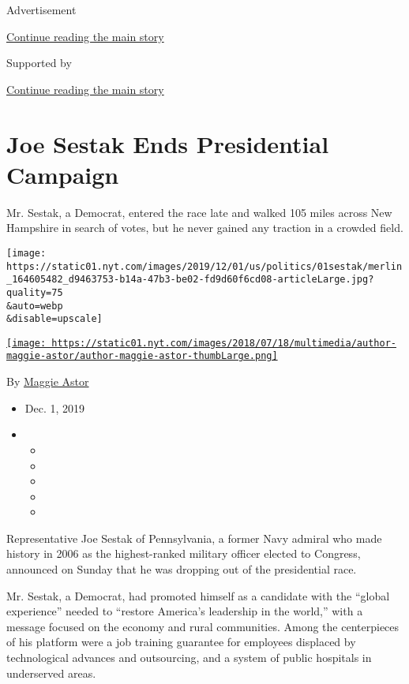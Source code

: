 Advertisement

\protect\hyperlink{after-top}{Continue reading the main story}

Supported by

\protect\hyperlink{after-sponsor}{Continue reading the main story}

\hypertarget{joe-sestak-ends-presidential-campaign}{%
\section{Joe Sestak Ends Presidential
Campaign}\label{joe-sestak-ends-presidential-campaign}}

Mr. Sestak, a Democrat, entered the race late and walked 105 miles
across New Hampshire in search of votes, but he never gained any
traction in a crowded field.

\texttt{[image: https://static01.nyt.com/images/2019/12/01/us/politics/01sestak/merlin\_164605482\_d9463753-b14a-47b3-be02-fd9d60f6cd08-articleLarge.jpg?quality=75\\\&auto=webp\\\&disable=upscale]}

\href{https://www.nytimes.com/by/maggie-astor}{\texttt{[image: https://static01.nyt.com/images/2018/07/18/multimedia/author-maggie-astor/author-maggie-astor-thumbLarge.png]}}

By \href{https://www.nytimes.com/by/maggie-astor}{Maggie Astor}

\begin{itemize}
\item
  Dec. 1, 2019
\item
  \begin{itemize}
  \item
  \item
  \item
  \item
  \item
  \end{itemize}
\end{itemize}

Representative Joe Sestak of Pennsylvania, a former Navy admiral who
made history in 2006 as the highest-ranked military officer elected to
Congress, announced on Sunday that he was dropping out of the
presidential race.

Mr. Sestak, a Democrat, had promoted himself as a candidate with the
``global experience'' needed to ``restore America's leadership in the
world,'' with a message focused on the economy and rural communities.
Among the centerpieces of his platform were a job training guarantee for
employees displaced by technological advances and outsourcing, and a
system of public hospitals in underserved areas.

